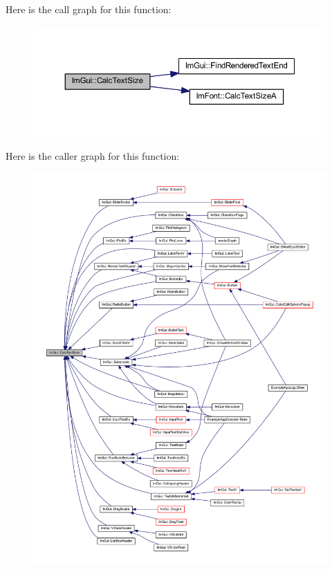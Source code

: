 Here is the call graph for this function\+:
\nopagebreak
\begin{figure}[H]
\begin{center}
\leavevmode
\includegraphics[width=350pt]{namespace_im_gui_a848b9db6cc4a186751c0ecebcaadc33b_cgraph}
\end{center}
\end{figure}
Here is the caller graph for this function\+:
\nopagebreak
\begin{figure}[H]
\begin{center}
\leavevmode
\includegraphics[width=350pt]{namespace_im_gui_a848b9db6cc4a186751c0ecebcaadc33b_icgraph}
\end{center}
\end{figure}
\mbox{\label{namespace_im_gui_ad3af0fc327467a44116d7d04018b9124}} 
